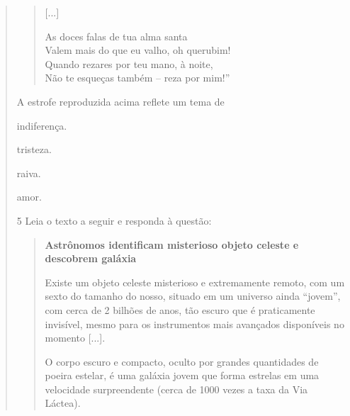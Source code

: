 \begin{quote}
\begin{quote}
{[}...{]}

As doces falas de tua alma santa\\
Valem mais do que eu valho, oh querubim!\\
Quando rezares por teu mano, à noite,\\
Não te esqueças também -- reza por mim!''

\end{quote}

A estrofe reproduzida acima reflete um tema de

\begin{escolha}
\item indiferença.

\item tristeza.

\item raiva.

\item amor.
\end{escolha}


\num{5} Leia o texto a seguir e responda à questão:

\begin{quote}
\textbf{Astrônomos identificam misterioso objeto celeste e descobrem
galáxia}

Existe um objeto celeste misterioso e extremamente remoto, com um
sexto do tamanho do nosso, situado em um universo ainda ``jovem'', com
cerca de 2 bilhões de anos, tão escuro que é praticamente invisível,
mesmo para os instrumentos mais avançados disponíveis no momento
{[}...{]}.

O corpo escuro e compacto, oculto por grandes quantidades de poeira
estelar, é uma galáxia jovem que forma estrelas em uma velocidade
surpreendente (cerca de 1000 vezes a taxa da Via Láctea).


\end{quote}
\end{quote}
